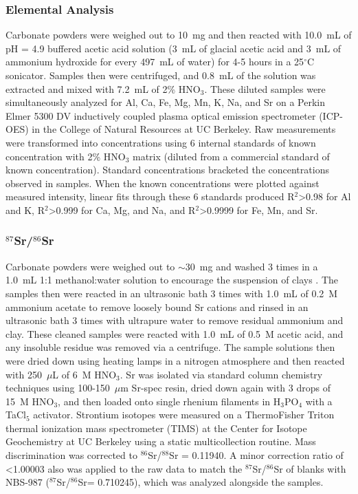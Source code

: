 \documentclass[11pt,letterpaper]{article}
\newcommand{\degC}{$^{\circ}$C\xspace}
\newcommand{\SrSr}{$^{87}$Sr/$^{86}$Sr\xspace}
\begin{document}
\subsubsection*{Elemental Analysis \label{sec:Elements}}

Carbonate powders were weighed out to 10~mg and then reacted with 10.0~mL of pH = 4.9 buffered acetic acid solution (3~mL of glacial acetic acid and 3~mL of ammonium hydroxide for every 497~mL of water) for 4-5 hours in a 25\degC sonicator. Samples then were centrifuged, and 0.8~mL of the solution was extracted and mixed with 7.2~mL of 2\% HNO$_{3}$. These diluted samples were simultaneously analyzed for Al, Ca, Fe, Mg, Mn, K, Na, and Sr on a Perkin Elmer 5300 DV inductively coupled plasma optical emission spectrometer (ICP-OES) in the College of Natural Resources at UC Berkeley. Raw measurements were transformed into concentrations using 6 internal standards of known concentration with 2\% HNO$_{3}$ matrix (diluted from a commercial standard of known concentration). Standard concentrations bracketed the concentrations observed in samples. When the known concentrations were plotted against measured intensity, linear fits through these 6 standards produced R$^{2}$\textgreater0.98 for Al and K, R$^{2}$\textgreater0.999 for Ca, Mg, and Na, and R$^{2}$\textgreater0.9999 for Fe, Mn, and Sr.

\subsubsection*{\SrSr \label{sec:SrSr}}

Carbonate powders were weighed out to $\sim$30~mg and washed 3 times in a 1.0~mL 1:1 methanol:water solution to encourage the suspension of clays \citep{McArthur2006a}. The samples then were reacted in an ultrasonic bath 3 times with 1.0~mL of 0.2~M ammonium acetate to remove loosely bound Sr cations and rinsed in an ultrasonic bath 3 times with ultrapure water to remove residual ammonium and clay. These cleaned samples were reacted with 1.0~mL of 0.5~M acetic acid, and any insoluble residue was removed via a centrifuge. The sample solutions then were dried down using heating lamps in a nitrogen atmosphere and then reacted with 250~$\mu$L of 6~M HNO$_{3}$. Sr was isolated via standard column chemistry techniques using 100-150~$\mu$m Sr-spec resin, dried down again with 3 drops of 15~M HNO$_{3}$, and then loaded onto single rhenium filaments in H$_{3}$PO$_{4}$ with a TaCl$_{5}$ activator. Strontium isotopes were measured on a ThermoFisher Triton thermal ionization mass spectrometer (TIMS) at the Center for Isotope Geochemistry at UC Berkeley using a static multicollection routine. Mass discrimination was corrected to $^{86}$Sr/$^{88}$Sr = 0.11940. A minor correction ratio of \textless1.00003 also was applied to the raw data to match the \SrSr of blanks with NBS-987 (\SrSr = 0.710245), which was analyzed alongside the samples.
\end{document}
